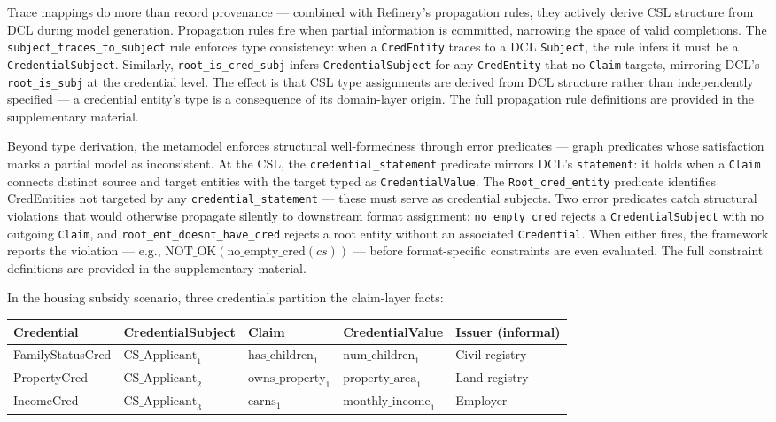 Trace mappings do more than record provenance --- combined with Refinery's propagation rules, they actively derive CSL structure from DCL during model generation. Propagation rules fire when partial information is committed, narrowing the space of valid completions. The \texttt{subject\_traces\_to\_subject} rule enforces type consistency: when a \texttt{CredEntity} traces to a DCL \texttt{Subject}, the rule infers it must be a \texttt{CredentialSubject}. Similarly, \texttt{root\_is\_cred\_subj} infers \texttt{CredentialSubject} for any \texttt{CredEntity} that no \texttt{Claim} targets, mirroring DCL's \texttt{root\_is\_subj} at the credential level. The effect is that CSL type assignments are derived from DCL structure rather than independently specified --- a credential entity's type is a consequence of its domain-layer origin. The full propagation rule definitions are provided in the supplementary material.

Beyond type derivation, the metamodel enforces structural well-formedness through error predicates --- graph predicates whose satisfaction marks a partial model as inconsistent. At the CSL, the \texttt{credential\_statement} predicate mirrors DCL's \texttt{statement}: it holds when a \texttt{Claim} connects distinct source and target entities with the target typed as \texttt{CredentialValue}. The \texttt{Root\_cred\_entity} predicate identifies CredEntities not targeted by any \texttt{credential\_statement} --- these must serve as credential subjects. Two error predicates catch structural violations that would otherwise propagate silently to downstream format assignment: \texttt{no\_empty\_cred} rejects a \texttt{CredentialSubject} with no outgoing \texttt{Claim}, and \texttt{root\_ent\_doesnt\_have\_cred} rejects a root entity without an associated \texttt{Credential}. When either fires, the framework reports the violation --- e.g., \(\text{NOT\_OK}(\text{no\_empty\_cred}(cs))\) --- before format-specific constraints are even evaluated. The full constraint definitions are provided in the supplementary material.

In the housing subsidy scenario, three credentials partition the claim-layer facts:

\begin{center}
\small
\setlength{\tabcolsep}{4pt}
\begin{tabularx}{\columnwidth}{LLLLL}
\toprule
Credential & CredentialSubject & Claim & CredentialValue & Issuer (informal) \\
\midrule
FamilyStatusCred & \(\text{CS\_Applicant}_1\) & \(\text{has\_children}_1\) & \(\text{num\_children}_1\) & Civil registry \\
PropertyCred & \(\text{CS\_Applicant}_2\) & \(\text{owns\_property}_1\) & \(\text{property\_area}_1\) & Land registry \\
IncomeCred & \(\text{CS\_Applicant}_3\) & \(\text{earns}_1\) & \(\text{monthly\_income}_1\) & Employer \\
\bottomrule
\end{tabularx}
\end{center}


